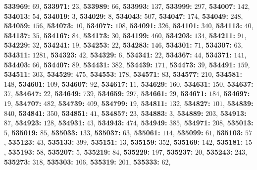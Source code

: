 \textsf{\bfseries 533969:} $69$, \textsf{\bfseries 533971:} $23$, \textsf{\bfseries 533989:} $66$, \textsf{\bfseries 533993:} $137$, \textsf{\bfseries 533999:} $297$, \textsf{\bfseries 534007:} $142$, \textsf{\bfseries 534013:} $54$, \textsf{\bfseries 534019:} $3$, \textsf{\bfseries 534029:} $8$, \textsf{\bfseries 534043:} $507$, \textsf{\bfseries 534047:} $174$, \textsf{\bfseries 534049:} $248$, \textsf{\bfseries 534059:} $156$, \textsf{\bfseries 534073:} $10$, \textsf{\bfseries 534077:} $108$, \textsf{\bfseries 534091:} $326$, \textsf{\bfseries 534101:} $340$, \textsf{\bfseries 534113:} $40$, \textsf{\bfseries 534137:} $35$, \textsf{\bfseries 534167:} $84$, \textsf{\bfseries 534173:} $30$, \textsf{\bfseries 534199:} $460$, \textsf{\bfseries 534203:} $134$, \textsf{\bfseries 534211:} $91$, \textsf{\bfseries 534229:} $32$, \textsf{\bfseries 534241:} $19$, \textsf{\bfseries 534253:} $22$, \textsf{\bfseries 534283:} $146$, \textsf{\bfseries 534301:} $71$, \textsf{\bfseries 534307:} $63$, \textsf{\bfseries 534311:} $1281$, \textsf{\bfseries 534323:} $42$, \textsf{\bfseries 534329:} $6$, \textsf{\bfseries 534341:} $22$, \textsf{\bfseries 534367:} $44$, \textsf{\bfseries 534371:} $141$, \textsf{\bfseries 534403:} $66$, \textsf{\bfseries 534407:} $89$, \textsf{\bfseries 534431:} $382$, \textsf{\bfseries 534439:} $171$, \textsf{\bfseries 534473:} $39$, \textsf{\bfseries 534491:} $159$, \textsf{\bfseries 534511:} $303$, \textsf{\bfseries 534529:} $475$, \textsf{\bfseries 534553:} $178$, \textsf{\bfseries 534571:} $83$, \textsf{\bfseries 534577:} $210$, \textsf{\bfseries 534581:} $148$, \textsf{\bfseries 534601:} $109$, \textsf{\bfseries 534607:} $92$, \textsf{\bfseries 534617:} $11$, \textsf{\bfseries 534629:} $160$, \textsf{\bfseries 534631:} $150$, \textsf{\bfseries 534637:} $37$, \textsf{\bfseries 534647:} $22$, \textsf{\bfseries 534649:} $739$, \textsf{\bfseries 534659:} $297$, \textsf{\bfseries 534661:} $29$, \textsf{\bfseries 534671:} $184$, \textsf{\bfseries 534697:} $19$, \textsf{\bfseries 534707:} $482$, \textsf{\bfseries 534739:} $409$, \textsf{\bfseries 534799:} $19$, \textsf{\bfseries 534811:} $132$, \textsf{\bfseries 534827:} $101$, \textsf{\bfseries 534839:} $840$, \textsf{\bfseries 534841:} $350$, \textsf{\bfseries 534851:} $41$, \textsf{\bfseries 534857:} $23$, \textsf{\bfseries 534883:} $3$, \textsf{\bfseries 534889:} $203$, \textsf{\bfseries 534913:} $87$, \textsf{\bfseries 534923:} $128$, \textsf{\bfseries 534931:} $43$, \textsf{\bfseries 534943:} $474$, \textsf{\bfseries 534949:} $385$, \textsf{\bfseries 534971:} $208$, \textsf{\bfseries 535013:} $5$, \textsf{\bfseries 535019:} $85$, \textsf{\bfseries 535033:} $133$, \textsf{\bfseries 535037:} $63$, \textsf{\bfseries 535061:} $114$, \textsf{\bfseries 535099:} $61$, \textsf{\bfseries 535103:} $57$, \textsf{\bfseries 535123:} $43$, \textsf{\bfseries 535133:} $399$, \textsf{\bfseries 535151:} $13$, \textsf{\bfseries 535159:} $352$, \textsf{\bfseries 535169:} $142$, \textsf{\bfseries 535181:} $15$, \textsf{\bfseries 535193:} $58$, \textsf{\bfseries 535207:} $5$, \textsf{\bfseries 535219:} $84$, \textsf{\bfseries 535229:} $197$, \textsf{\bfseries 535237:} $20$, \textsf{\bfseries 535243:} $243$, \textsf{\bfseries 535273:} $318$, \textsf{\bfseries 535303:} $106$, \textsf{\bfseries 535319:} $201$, \textsf{\bfseries 535333:} $62$, 
